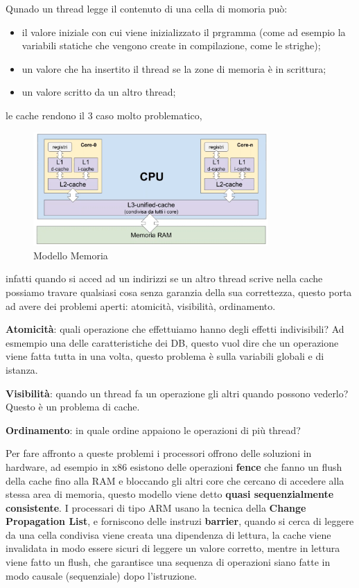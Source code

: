 \documentclass[12pt]{article}
\begin{document}
Qunado un thread legge il contenuto di una cella di momoria pu\`o:
\begin{itemize}
  \item il valore iniziale con cui viene inizializzato il prgramma (come ad esempio la variabili statiche che vengono create in compilazione, come le strighe);
  \item un valore che ha insertito il thread se la zone di memoria \`e in scrittura;
  \item un valore scritto da un altro thread;
\end{itemize}
le cache rendono il 3 caso molto problematico,
\begin{figure}[H]
  \centering
  \includegraphics[width=0.8\textwidth]{modello-memoria.png}
  \caption{Modello Memoria}
  \label{fig:modello-memoria}
\end{figure}
infatti quando si acced ad un indirizzi se un altro thread scrive nella cache possiamo travare qualsiasi cosa senza garanzia della sua correttezza, questo porta ad avere dei problemi aperti: atomicit\`a, visibilit\`a, ordinamento.

\textbf{Atomicit\`a}: quali operazione che effettuiamo hanno degli effetti indivisibili? Ad esmempio una delle caratteristiche dei DB, questo vuol dire che un operazione viene fatta tutta in una volta, questo problema \`e sulla variabili globali e di istanza.

\textbf{Visibilit\`a}: quando un thread fa un operazione gli altri quando possono vederlo? Questo \`e un problema di cache.

\textbf{Ordinamento}: in quale ordine appaiono le operazioni di pi\`u thread?

Per fare affronto a queste problemi i processori offrono delle soluzioni in hardware, ad esempio in x86 esistono delle operazioni \textbf{fence} che fanno un flush della cache fino alla RAM e bloccando gli altri core che cercano di accedere alla stessa area di memoria, questo modello viene detto \textbf{quasi sequenzialmente consistente}. I processari di tipo ARM usano la tecnica della \textbf{Change Propagation List}, e forniscono delle instruzi \textbf{barrier}, quando si cerca di leggere da una cella condivisa viene creata una dipendenza di lettura, la cache viene invalidata in modo essere sicuri di leggere un valore corretto, mentre in lettura viene fatto un flush, che garantisce una sequenza di operazioni siano fatte in modo causale (sequenziale) dopo l'istruzione.
\end{document}
